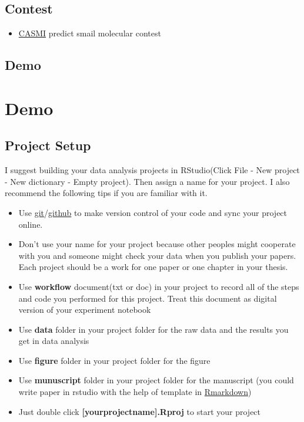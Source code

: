 \documentclass[
]{book}
\providecommand{\tightlist}{%
  \setlength{\itemsep}{0pt}\setlength{\parskip}{0pt}}
\begin{document}
\hypertarget{contest}{%
\section{Contest}\label{contest}}

\begin{itemize}
\tightlist
\item
  \href{http://www.casmi-contest.org/}{CASMI} predict smail molecular contest
\end{itemize}

\hypertarget{demo}{%
\section{Demo}\label{demo}}

\hypertarget{demo-1}{%
\chapter{Demo}\label{demo-1}}

\hypertarget{project-setup}{%
\section{Project Setup}\label{project-setup}}

I suggest building your data analysis projects in RStudio(Click File - New project - New dictionary - Empty project). Then assign a name for your project. I also recommend the following tips if you are familiar with it.

\begin{itemize}
\item
  Use \href{https://git-scm.com/}{git}/\href{https://github.com/}{github} to make version control of your code and sync your project online.
\item
  Don't use your name for your project because other peoples might cooperate with you and someone might check your data when you publish your papers. Each project should be a work for one paper or one chapter in your thesis.
\item
  Use \textbf{workflow} document(txt or doc) in your project to record all of the steps and code you performed for this project. Treat this document as digital version of your experiment notebook
\item
  Use \textbf{data} folder in your project folder for the raw data and the results you get in data analysis
\item
  Use \textbf{figure} folder in your project folder for the figure
\item
  Use \textbf{munuscript} folder in your project folder for the manuscript (you could write paper in rstudio with the help of template in \href{https://github.com/rstudio/rticles}{Rmarkdown})
\item
  Just double click \textbf{{[}yourprojectname{]}.Rproj} to start your project
\end{itemize}
\end{document}
